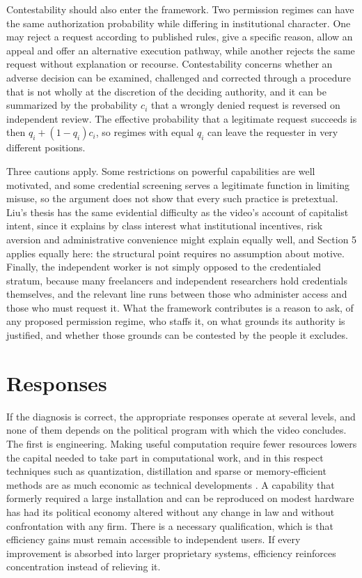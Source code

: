 \documentclass[11pt]{article}
\theoremstyle{plain}
\theoremstyle{definition}
\begin{document}
Contestability should also enter the framework. Two permission regimes can have the same authorization probability while differing in institutional character. One may reject a request according to published rules, give a specific reason, allow an appeal and offer an alternative execution pathway, while another rejects the same request without explanation or recourse. Contestability concerns whether an adverse decision can be examined, challenged and corrected through a procedure that is not wholly at the discretion of the deciding authority, and it can be summarized by the probability $c_i$ that a wrongly denied request is reversed on independent review. The effective probability that a legitimate request succeeds is then $q_i+(1-q_i)c_i$, so regimes with equal $q_i$ can leave the requester in very different positions.

Three cautions apply. Some restrictions on powerful capabilities are well motivated, and some credential screening serves a legitimate function in limiting misuse, so the argument does not show that every such practice is pretextual. Liu's thesis has the same evidential difficulty as the video's account of capitalist intent, since it explains by class interest what institutional incentives, risk aversion and administrative convenience might explain equally well, and Section 5 applies equally here: the structural point requires no assumption about motive. Finally, the independent worker is not simply opposed to the credentialed stratum, because many freelancers and independent researchers hold credentials themselves, and the relevant line runs between those who administer access and those who must request it. What the framework contributes is a reason to ask, of any proposed permission regime, who staffs it, on what grounds its authority is justified, and whether those grounds can be contested by the people it excludes.

\section{Responses}

If the diagnosis is correct, the appropriate responses operate at several levels, and none of them depends on the political program with which the video concludes. The first is engineering. Making useful computation require fewer resources lowers the capital needed to take part in computational work, and in this respect techniques such as quantization, distillation and sparse or memory-efficient methods are as much economic as technical developments \cite{hinton,frantar,dettmers}. A capability that formerly required a large installation and can be reproduced on modest hardware has had its political economy altered without any change in law and without confrontation with any firm. There is a necessary qualification, which is that efficiency gains must remain accessible to independent users. If every improvement is absorbed into larger proprietary systems, efficiency reinforces concentration instead of relieving it.
\end{document}
